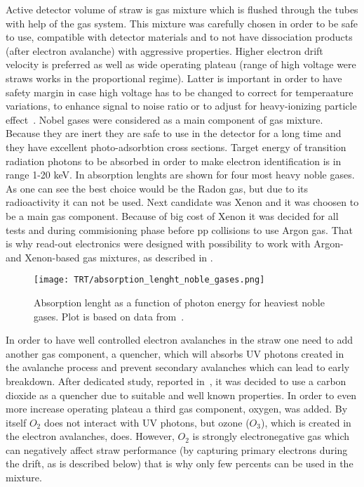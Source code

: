 Active detector volume of straw is gas mixture which is flushed through the tubes with help of the gas system.
This mixture was carefully chosen in order to be safe to use, compatible with detector materials and to not have dissociation products (after electron avalanche) 
with aggressive properties.
Higher electron drift velocity is preferred as well as wide operating plateau (range of high voltage were straws works in the proportional regime). 
Latter is important in order to have 
safety margin in case high voltage has to be changed to correct for temperaature variations, to enhance signal to noise ratio or to adjust for 
heavy-ionizing particle effect~\cite{Abat:2008zza}.
Nobel gases were considered as a main component of gas mixture. Because they are inert they are safe to use in the detector for a long time and they have 
excellent photo-adsorbtion cross sections.
Target energy of transition radiation photons to be absorbed in order to make electron identification is in range 1-20 keV.
In  absorption lenghts are shown for four most heavy noble gases.
As one can see the best choice would be the Radon gas, but due to its radioactivity it can not be used.
Next candidate was Xenon and it was choosen to be a main gas component.
Because of big cost of Xenon it was decided for all tests and during commisioning phase before pp collisions to use Argon gas. That is why read-out electronics were
designed with possibility to work with Argon- and Xenon-based gas mixtures, as described in .

\begin{figure}
\centering
\texttt{[image: TRT/absorption\_lenght\_noble\_gases.png]}
\caption{ 
  Absorption lenght as a function of photon energy for heaviest noble gases. Plot is based on data from~\cite{Hubbell:353989}.
}
\label{fig:absorption_lenght}
\end{figure}

In order to have well controlled electron avalanches in the straw one need to add another gas component, a quencher, 
which will absorbs UV photons created in the avalanche process and prevent secondary avalanches which can lead to early breakdown.
After dedicated study, reported in~\cite{Abat:2008zza}, it was decided to use a carbon dioxide as a quencher due to suitable and well known properties.
In order to even more increase operating plateau a third gas component, oxygen, was added.
By itself $O_2$ does not interact with UV photons, but ozone ($O_3$), which is created in the electron avalanches, does.
However, $O_2$ is strongly electronegative gas which can negatively affect straw performance (by capturing primary electrons during the drift, as is described below)
that is why only few percents can be used in the mixture.
 
